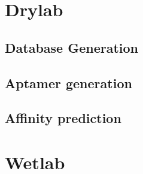 \documentclass{article}
\begin{document}
\tableofcontents
\section{Drylab}
\subsection{Database Generation}
\subsection{Aptamer generation}
\subsection {Affinity prediction}
\section{Wetlab}
\end{document}
